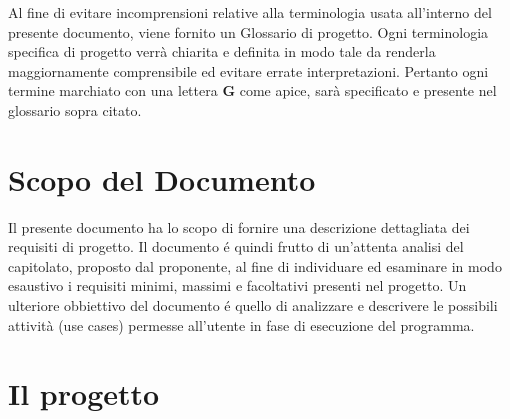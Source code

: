 \begin{beginningnote}
    Al fine di evitare incomprensioni relative alla terminologia usata all’interno del presente documento, viene fornito un Glossario di progetto. Ogni terminologia specifica di progetto verrà chiarita e definita in modo tale da renderla maggiornamente comprensibile ed evitare errate interpretazioni. Pertanto ogni termine marchiato con una lettera \textbf{G} come apice, sarà specificato e presente nel glossario sopra citato.
\end{beginningnote}

\section{Scopo del Documento}\label{sec:scopo_del_documento}
Il presente documento ha lo scopo di fornire una descrizione dettagliata dei requisiti di progetto. Il documento é quindi frutto di un'attenta analisi del capitolato, proposto dal proponente, al fine di individuare ed esaminare in modo esaustivo i requisiti minimi, massimi e facoltativi presenti nel progetto. 
Un ulteriore obbiettivo del documento é quello di analizzare e descrivere le possibili attività (use cases) permesse all'utente in fase di esecuzione del programma. 

\section{Il progetto}\label{sec:progetto}
